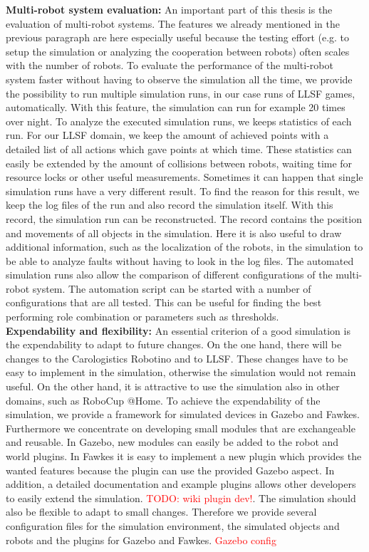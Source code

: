 \textbf{Multi-robot system evaluation:} An important part of this thesis is the evaluation of multi-robot systems. The features we already mentioned in the previous paragraph are here especially useful because the testing effort (e.g. to setup the simulation or analyzing the cooperation between robots) often scales with the number of robots. To evaluate the performance of the multi-robot system faster without having to observe the simulation all the time, we provide the possibility to run multiple simulation runs, in our case runs of LLSF games, automatically. With this feature, the simulation can run for example 20 times over night. To analyze the executed simulation runs, we keeps statistics of each run. For our LLSF domain, we keep the amount of achieved points with a detailed list of all actions which gave points at which time. These statistics can easily be extended by the amount of collisions between robots, waiting time for resource locks or other useful measurements. Sometimes it can happen that single simulation runs have a very different result. To find the reason for this result, we keep the log files of the run and also record the simulation itself. With this record, the simulation run can be reconstructed. The record contains the position and movements of all objects in the simulation. Here it is also useful to draw additional information, such as the localization of the robots, in the simulation to be able to analyze faults without having to look in the log files. The automated simulation runs also allow the comparison of different configurations of the multi-robot system. The automation script can be started with a number of configurations that are all tested. This can be useful for finding the best performing role combination or parameters such as thresholds.\\
\textbf{Expendability and flexibility:} An essential criterion of a good simulation is the expendability to adapt to future changes. On the one hand, there will be changes to the Carologistics Robotino and to LLSF. These changes have to be easy to implement in the simulation, otherwise the simulation would not remain useful. On the other hand, it is attractive to use the simulation also in other domains, such as RoboCup @Home. To achieve the expendability of the simulation, we provide a framework for simulated devices in Gazebo and Fawkes. Furthermore we concentrate on developing small modules that are exchangeable and reusable. In Gazebo, new modules can easily be added to the robot and world plugins. In Fawkes it is easy to implement a new plugin which provides the wanted features because the plugin can use the provided Gazebo aspect. In addition, a detailed documentation and example plugins allows other developers to easily extend the simulation. \textcolor{red}{TODO: wiki plugin dev!}. The simulation should also be flexible to adapt to small changes. Therefore we provide several configuration files for the simulation environment, the simulated objects and robots and the plugins for Gazebo and Fawkes. \textcolor{red}{Gazebo config}



